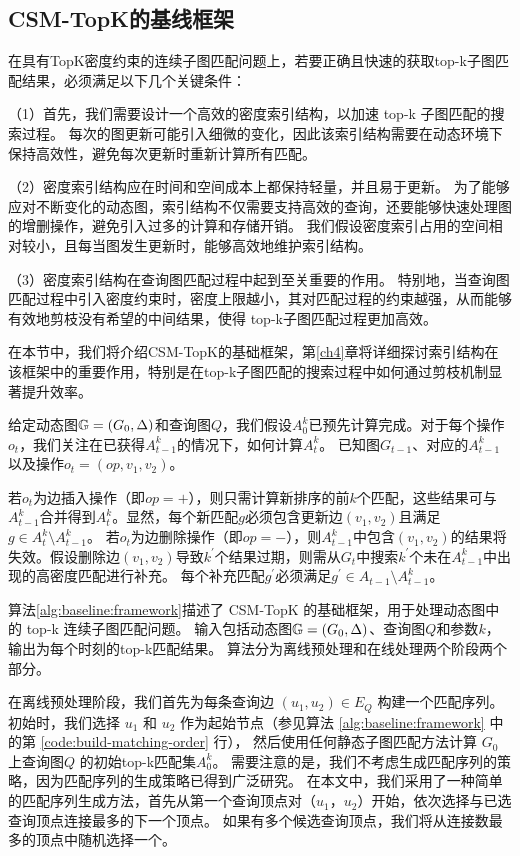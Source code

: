 \subsection{CSM-TopK的基线框架}
\label{ch3:base-framework}
在具有TopK密度约束的连续子图匹配问题上，若要正确且快速的获取top-k子图匹配结果，必须满足以下几个关键条件：

（1）首先，我们需要设计一个高效的密度索引结构，以加速 top-k 子图匹配的搜索过程。
每次的图更新可能引入细微的变化，因此该索引结构需要在动态环境下保持高效性，避免每次更新时重新计算所有匹配。

（2）密度索引结构应在时间和空间成本上都保持轻量，并且易于更新。
为了能够应对不断变化的动态图，索引结构不仅需要支持高效的查询，还要能够快速处理图的增删操作，避免引入过多的计算和存储开销。
我们假设密度索引占用的空间相对较小，且每当图发生更新时，能够高效地维护索引结构。

（3）密度索引结构在查询图匹配过程中起到至关重要的作用。
特别地，当查询图匹配过程中引入密度约束时，密度上限越小，其对匹配过程的约束越强，从而能够有效地剪枝没有希望的中间结果，使得 top-k子图匹配过程更加高效。

在本节中，我们将介绍CSM-TopK的基础框架，第\ref{ch4}章将详细探讨索引结构在该框架中的重要作用，特别是在top-k子图匹配的搜索过程中如何通过剪枝机制显著提升效率。


给定动态图$\mathbb{G}=(G_0, \Delta)$和查询图$Q$，我们假设$A_0^k$已预先计算完成。对于每个操作$o_t$，我们关注在已获得$A_{t-1}^k$的情况下，如何计算$A_t^k$。
已知图$G_{t-1}$、对应的$A_{t-1}^k$以及操作$o_t=(op, v_1, v_2)$。

若$o_t$为边插入操作（即$op=+$），则只需计算新排序的前$k$个匹配，这些结果可与$A_{t-1}^k$合并得到$A_t^k$。显然，每个新匹配$g$必须包含更新边$(v_1, v_2)$且满足$g\in A_t^k\setminus A_{t-1}^k$。
若$o_t$为边删除操作（即$op=-$），则$A_{t-1}^k$中包含$(v_1, v_2)$的结果将失效。假设删除边$(v_1, v_2)$导致$k^\prime$个结果过期，则需从$G_t$中搜索$k^\prime$个未在$A_{t-1}^k$中出现的高密度匹配进行补充。
每个补充匹配$g^\prime$必须满足$g^\prime \in A_{t-1} \setminus A_{t-1}^k$。

算法\ref{alg:baseline:framework}描述了 CSM-TopK 的基础框架，用于处理动态图中的 top-k 连续子图匹配问题。
输入包括动态图$\mathbb{G}=(G_0, \Delta)$、查询图$Q$和参数$k$，输出为每个时刻的top-k匹配结果。
算法分为离线预处理和在线处理两个阶段两个部分。

在离线预处理阶段，我们首先为每条查询边 $(u_1, u_2) \in E_Q$ 构建一个匹配序列。初始时，我们选择 $u_1$ 和 $u_2$ 作为起始节点（参见算法 \ref{alg:baseline:framework} 中的第 \ref{code:build-matching-order} 行），
然后使用任何静态子图匹配方法计算 $G_0$ 上查询图$Q$ 的初始top-k匹配集$A_0^k$。
需要注意的是，我们不考虑生成匹配序列的策略，因为匹配序列的生成策略已得到广泛研究。
在本文中，我们采用了一种简单的匹配序列生成方法，首先从第一个查询顶点对（$u_1$，$u_2$）开始，依次选择与已选查询顶点连接最多的下一个顶点。
如果有多个候选查询顶点，我们将从连接数最多的顶点中随机选择一个。

